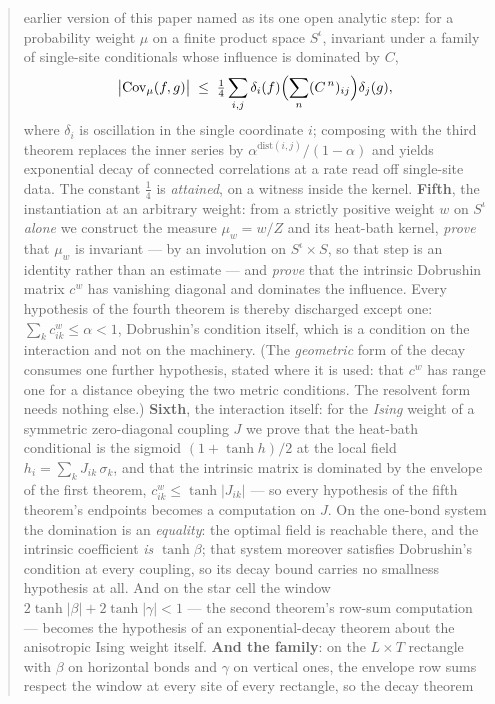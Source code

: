 \documentclass[11pt]{article}
\theoremstyle{definition}
\newcommand{\dist}{\mathrm{dist}}
\begin{document}
\begin{abstract}
earlier version of this paper named as its one open analytic step: for a
probability weight $\mu$ on a finite product space
$S^{\iota}$, invariant under a family of single-site conditionals whose
influence is dominated by $C$,
\[
  \bigl|\mathrm{Cov}_\mu(f,g)\bigr|\;\le\;
  \tfrac14\sum_{i,j}\delta_i(f)\Bigl(\sum_{n}(C^{\,n})_{ij}\Bigr)\delta_j(g),
\]
where $\delta_i$ is oscillation in the single coordinate $i$; composing with
the third theorem replaces the inner series by $\alpha^{\dist(i,j)}/(1-\alpha)$
and yields exponential decay of connected correlations at a rate read off
single-site data.  The constant $\tfrac14$ is \emph{attained}, on a witness
inside the kernel.  \textbf{Fifth}, the instantiation at an arbitrary weight: from a strictly
positive weight $w$ on $S^{\iota}$
\emph{alone} we construct the measure $\mu_w=w/Z$ and its heat-bath kernel,
\emph{prove} that $\mu_w$ is invariant --- by an involution on
$S^{\iota}\times S$, so that step is an identity rather than an estimate ---
and \emph{prove} that the intrinsic Dobrushin matrix $c^w$ has vanishing
diagonal and dominates the influence.  Every hypothesis of the fourth theorem
is thereby discharged except one: $\sum_k c^w_{ik}\le\alpha<1$, Dobrushin's
condition itself, which is a condition on the interaction and not on the
machinery.  (The \emph{geometric} form of the decay consumes one further
hypothesis, stated where it is used: that $c^w$ has range one for a distance
obeying the two metric conditions.  The resolvent form needs nothing else.)
\textbf{Sixth}, the interaction itself: for the \emph{Ising} weight of a
symmetric zero-diagonal coupling $J$ we prove that the heat-bath conditional
is the sigmoid $(1+\tanh h)/2$ at the local field
$h_i=\sum_k J_{ik}\,\sigma_k$, and that the intrinsic matrix is dominated by
the envelope of the first theorem, $c^{w}_{ik}\le\tanh|J_{ik}|$ --- so every
hypothesis of the fifth theorem's endpoints becomes a computation on $J$.  On
the one-bond system the domination is an \emph{equality}: the optimal field is
reachable there, and the intrinsic coefficient \emph{is} $\tanh\beta$; that
system moreover satisfies Dobrushin's condition at every coupling, so its
decay bound carries no smallness hypothesis at all.  And on the star cell the
window $2\tanh|\beta|+2\tanh|\gamma|<1$ --- the second theorem's row-sum
computation --- becomes the hypothesis of an exponential-decay theorem about
the anisotropic Ising weight itself.
\textbf{And the family}: on the $L\times T$ rectangle with $\beta$ on
horizontal bonds and $\gamma$ on vertical ones, the envelope row sums
respect the window at every site of every rectangle, so the decay theorem

\end{abstract}
\end{document}
